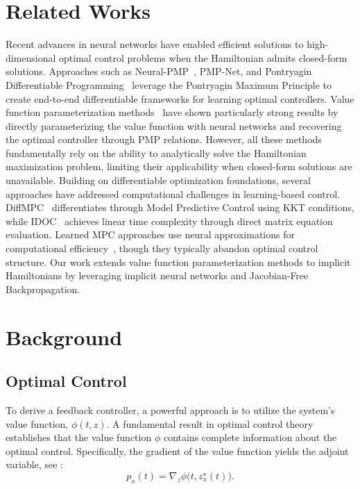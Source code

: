 \documentclass[letterpaper, 10 pt, conference]{ieeeconf}  %
\begin{document}
    \section{Related Works}\label{sec:related_works}
    Recent advances in neural networks have enabled efficient solutions to high-dimensional optimal control problems when the Hamiltonian admits closed-form solutions. 
    Approaches such as Neural-PMP~\cite{gu2022pontryagin}, PMP-Net, and Pontryagin Differentiable Programming~\cite{jin2020pontryagin, jin2021safe} leverage the Pontryagin Maximum Principle to create end-to-end differentiable frameworks for learning optimal controllers. Value function parameterization methods~\cite{ruthotto2020machine, li2024neural, onken2022neural, onken2021ot, onken2021neural, Verma-HJB-RL, lin2021alternating} have shown particularly strong results by directly parameterizing the value function with neural networks and recovering the optimal controller through PMP relations. However, all these methods fundamentally rely on the ability to analytically solve the Hamiltonian maximization problem, limiting their applicability when closed-form solutions are unavailable. Building on differentiable optimization foundations, several approaches have addressed computational challenges in learning-based control. DiffMPC~\cite{amos2018differentiable} differentiates through Model Predictive Control using KKT conditions, while IDOC~\cite{xu2023revisiting} achieves linear time complexity through direct matrix equation evaluation. Learned MPC approaches use neural approximations for computational efficiency~\cite{hertneck2018learning}, though they typically abandon optimal control structure. Our work extends value function parameterization methods to implicit Hamiltonians by leveraging implicit neural networks and Jacobian-Free Backpropagation.

    \section{Background}
    \subsection{Optimal Control} 
    \label{sec:OC_back}
    
    To derive a feedback controller, a powerful approach is to utilize the system's value function, $\phi(t,z)$. A fundamental result in optimal control theory establishes that the value function $\phi$ contains complete information about the optimal control. Specifically, the gradient of the value function yields the adjoint variable, see \cite[Theorem I.6.2]{fleming2006controlled}:
    \begin{equation}\label{eq:gradPhi}
    p_{x}(t)=\nabla_{z} \phi \big(t,z_{x}^\star(t) \big).
    \end{equation}
    
\end{document}
